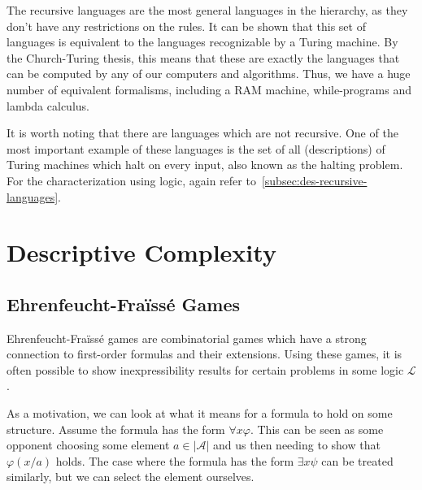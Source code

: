 The recursive languages are the most general languages in the hierarchy, as they don't have any restrictions on the rules.
It can be shown that this set of languages is equivalent to the languages recognizable by a Turing machine.
By the Church-Turing thesis, this means that these are exactly the languages that can be computed by any of our computers and algorithms.
Thus, we have a huge number of equivalent formalisms, including a RAM machine, while-programs and lambda calculus.

It is worth noting that there are languages which are not recursive.
One of the most important example of these languages is the set of all (descriptions) of Turing machines which halt on every input, also known as the halting problem.
For the characterization using logic, again refer to~\cref{subsec:des-recursive-languages}.

\section{Descriptive Complexity}\label{sec:descriptive-complexity-context}

\subsection{Ehrenfeucht-Fraïssé Games}\label{subsec:ehrenfeucht-fraisse-games}

Ehrenfeucht-Fraïssé games are combinatorial games which have a strong connection to first-order formulas and their extensions.
Using these games, it is often possible to show inexpressibility results for certain problems in some logic $\mathcal{L}$.

As a motivation, we can look at what it means for a formula to hold on some structure.
Assume the formula has the form $\forall x\varphi$.
This can be seen as some opponent choosing some element $a \in |\mathcal{A}|$ and us then needing to show that $\varphi(x / a)$ holds.
The case where the formula has the form $\exists x\psi$ can be treated similarly, but we can select the element ourselves.

